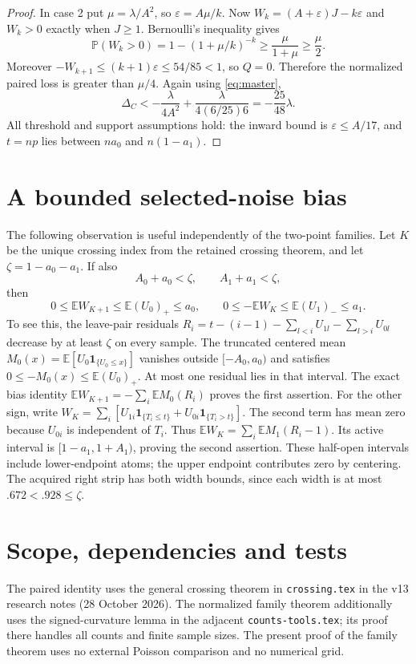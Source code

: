 \documentclass[11pt,a4paper]{article}
\newcommand{\E}{\mathbb E}\newcommand{\Pp}{\mathbb P}
\begin{document}
\begin{proof}
In case 2 put $\mu=\lambda/A^2$, so $\varepsilon=A\mu/k$.
Now $W_k=(A+\varepsilon)J-k\varepsilon$ and $W_k>0$ exactly when
$J\ge1$. Bernoulli's inequality gives
\[
 \Pp(W_k>0)=1-(1+\mu/k)^{-k}
       \ge\frac\mu{1+\mu}\ge\frac\mu2.
\]
Moreover $-W_{k+1}\le(k+1)\varepsilon\le54/85<1$, so $Q=0$.
Therefore the normalized paired loss is greater than $\mu/4$.
Again using \eqref{eq:master},
\[
 \Delta_C<-\frac\lambda{4A^2}+\frac\lambda{4(6/25)6}
           =-\frac{25}{48}\lambda.
\]
All threshold and support assumptions hold: the inward bound is
$\varepsilon\le A/17$, and $t=np$ lies between $na_0$ and $n(1-a_1)$.
\end{proof}

\section{A bounded selected-noise bias}
The following observation is useful independently of the two-point families.
Let $K$ be the unique crossing index from the retained crossing theorem,
and let $\zeta=1-a_0-a_1$. If also
\[
 A_0+a_0<\zeta,\qquad A_1+a_1<\zeta,
\]
then
\begin{equation}\label{eq:bias}
 0\le\E W_{K+1}\le\E(U_0)_+\le a_0,
 \qquad 0\le-\E W_K\le\E(U_1)_-\le a_1.
\end{equation}
To see this, the leave-pair residuals
$R_i=t-(i-1)-\sum_{l<i}U_{1l}-\sum_{l>i}U_{0l}$ decrease by at least
$\zeta$ on every sample. The truncated centered mean
$M_0(x)=\E[U_0\mathbf1_{\{U_0\le x\}}]$ vanishes outside
$[-A_0,a_0)$ and satisfies $0\le-M_0(x)\le\E(U_0)_+$.
At most one residual lies in that interval. The exact bias identity
$\E W_{K+1}=-\sum_i\E M_0(R_i)$ proves the first assertion.
For the other sign, write
$W_K=\sum_i[U_{1i}\mathbf1_{\{T_i\le t\}}+U_{0i}\mathbf1_{\{T_i>t\}}]$.
The second term has mean zero because $U_{0i}$ is independent of $T_i$.
Thus $\E W_K=\sum_i\E M_1(R_i-1)$. Its active interval is
$[1-a_1,1+A_1)$, proving the second assertion. These half-open intervals include
lower-endpoint atoms; the upper endpoint contributes zero by centering.
The acquired right strip has both width bounds, since each width is at
most $.672<.928\le\zeta$.

\section{Scope, dependencies and tests}
The paired identity uses the general crossing theorem in
\texttt{crossing.tex} in the v13 research notes (28 October 2026).
The normalized family theorem additionally uses the signed-curvature lemma
in the adjacent \texttt{counts-tools.tex}; its proof there handles all
counts and finite sample sizes. The present proof of the family theorem
uses no external Poisson comparison and no numerical grid.
\end{document}
